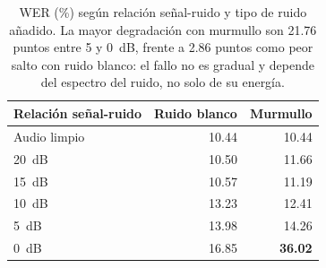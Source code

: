 \begin{table}[h]
\centering
\small
\begin{tabular}{|l|r|r|}
    \hline
    \textbf{Relación señal-ruido} & \textbf{Ruido blanco} & \textbf{Murmullo} \\
    \hline
    Audio limpio & 10.44 & 10.44 \\
    20~dB & 10.50 & 11.66 \\
    15~dB & 10.57 & 11.19 \\
    10~dB & 13.23 & 12.41 \\
    5~dB & 13.98 & 14.26 \\
    0~dB & 16.85 & \textbf{36.02} \\
    \hline
\end{tabular}
\caption{WER (\%) según relación señal-ruido y tipo de ruido añadido. La mayor
degradación con murmullo son 21.76 puntos entre 5 y 0~dB, frente a
2.86 puntos como peor salto con ruido blanco: el fallo no es gradual y depende
del espectro del ruido, no solo de su energía.}
\label{tab:ruido}
\end{table}
